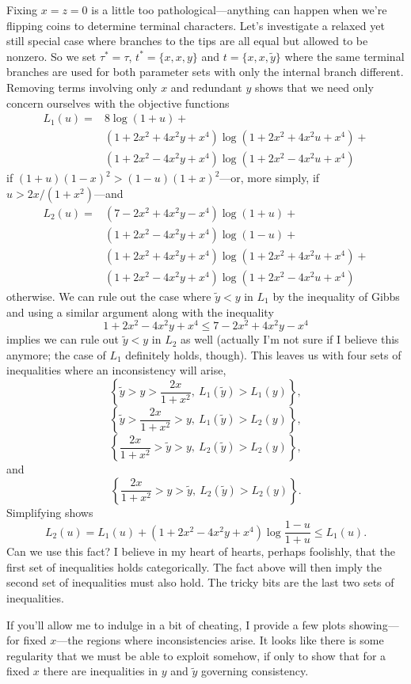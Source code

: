Fixing $x=z=0$ is a little too pathological---anything can happen when we're flipping coins to determine terminal characters.
Let's investigate a relaxed yet still special case where branches to the tips are all equal but allowed to be nonzero.
So we set $\tau^*=\tau$, $t^*=\{x,x,y\}$ and $t=\{x,x,\tilde{y}\}$ where the same terminal branches are used for both parameter sets with only the internal branch different.
Removing terms involving only $x$ and redundant $y$ shows that we need only concern ourselves with the objective functions
\begin{align*}
L_1(u) =& 8\log(1+u) + \\
  &(1+2x^2+4x^2y+x^4)\log(1+2x^2+4x^2u+x^4) + \\
  &(1+2x^2-4x^2y+x^4)\log(1+2x^2-4x^2u+x^4)
\end{align*}
if $(1+u)(1-x)^2 > (1-u)(1+x)^2$---or, more simply, if $u > 2x / (1+x^2)$---and
\begin{align*}
L_2(u) =& (7-2x^2+4x^2y-x^4)\log(1+u) + \\
  &(1+2x^2-4x^2y+x^4)\log(1-u) + \\
  &(1+2x^2+4x^2y+x^4)\log(1+2x^2+4x^2u+x^4) + \\
  &(1+2x^2-4x^2y+x^4)\log(1+2x^2-4x^2u+x^4)
\end{align*}
otherwise.
We can rule out the case where $\tilde{y} < y$ in $L_1$ by the inequality of Gibbs and using a similar argument along with the inequality
$$
1+2x^2-4x^2y+x^4 \le 7-2x^2+4x^2y-x^4
$$
implies we can rule out $\tilde{y} < y$ in $L_2$ as well (actually I'm not sure if I believe this anymore; the case of $L_1$ definitely holds, though).
This leaves us with four sets of inequalities where an inconsistency will arise,
$$
\left\{\tilde{y} > y > \frac{2x}{1+x^2}, \ L_1(\tilde{y}) > L_1(y)\right\}, 
$$
$$
\left\{\tilde{y} > \frac{2x}{1+x^2} > y, \ L_1(\tilde{y}) > L_2(y)\right\}, 
$$
$$
\left\{\frac{2x}{1+x^2} > \tilde{y} > y, \ L_2(\tilde{y}) > L_2(y)\right\},
$$
and
$$
\left\{\frac{2x}{1+x^2} > y > \tilde{y}, \ L_2(\tilde{y}) > L_2(y)\right\}.
$$
Simplifying shows
$$
L_2(u) = L_1(u) + (1+2x^2-4x^2y+x^4)\log\frac{1-u}{1+u} \le L_1(u).
$$
Can we use this fact?
I believe in my heart of hearts, perhaps foolishly, that the first set of inequalities holds categorically.
The fact above will then imply the second set of inequalities must also hold.
The tricky bits are the last two sets of inequalities.

If you'll allow me to indulge in a bit of cheating, I provide a few plots showing---for fixed $x$---the regions where inconsistencies arise.
It looks like there is some regularity that we must be able to exploit somehow, if only to show that for a fixed $x$ there are inequalities in $y$ and $\tilde{y}$ governing consistency.

